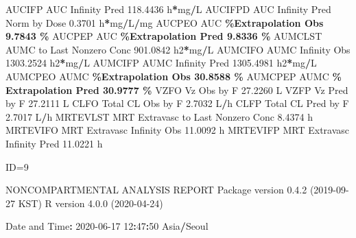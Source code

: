 \documentclass[
  12pt,
]{krantz}
\newenvironment{Shaded}{\begin{snugshade}}{\end{snugshade}}
\newcommand{\DecValTok}[1]{\textcolor[rgb]{0.00,0.00,0.81}{#1}}
\newcommand{\FloatTok}[1]{\textcolor[rgb]{0.00,0.00,0.81}{#1}}
\newcommand{\NormalTok}[1]{#1}
\newcommand{\OperatorTok}[1]{\textcolor[rgb]{0.81,0.36,0.00}{\textbf{#1}}}
\newcommand{\StringTok}[1]{\textcolor[rgb]{0.31,0.60,0.02}{#1}}
\begin{document}
\begin{Shaded}
\begin{Highlighting}[]
\NormalTok{AUCIFP     AUC Infinity Pred                             }\FloatTok{118.4436}\NormalTok{ h}\OperatorTok{*}\NormalTok{mg}\OperatorTok{/}\NormalTok{L}
\NormalTok{AUCIFPD    AUC Infinity Pred Norm by Dose                  }\FloatTok{0.3701}\NormalTok{ h}\OperatorTok{*}\NormalTok{mg}\OperatorTok{/}\NormalTok{L}\OperatorTok{/}\NormalTok{mg}
\NormalTok{AUCPEO     AUC }\OperatorTok{\%Extrapolation Obs                          9.7843 \%}
\NormalTok{AUCPEP     AUC }\OperatorTok{\%Extrapolation Pred                         9.8336 \%}
\NormalTok{AUMCLST    AUMC to Last Nonzero Conc                     }\FloatTok{901.0842}\NormalTok{ h2}\OperatorTok{*}\NormalTok{mg}\OperatorTok{/}\NormalTok{L}
\NormalTok{AUMCIFO    AUMC Infinity Obs                            }\FloatTok{1303.2524}\NormalTok{ h2}\OperatorTok{*}\NormalTok{mg}\OperatorTok{/}\NormalTok{L}
\NormalTok{AUMCIFP    AUMC Infinity Pred                           }\FloatTok{1305.4981}\NormalTok{ h2}\OperatorTok{*}\NormalTok{mg}\OperatorTok{/}\NormalTok{L}
\NormalTok{AUMCPEO    AUMC }\OperatorTok{\%Extrapolation Obs                        30.8588 \%}
\NormalTok{AUMCPEP    AUMC }\OperatorTok{\% Extrapolation Pred                      30.9777 \%}
\NormalTok{VZFO       Vz Obs by F                                    }\FloatTok{27.2260}\NormalTok{ L}
\NormalTok{VZFP       Vz Pred by F                                   }\FloatTok{27.2111}\NormalTok{ L}
\NormalTok{CLFO       Total CL Obs by F                               }\FloatTok{2.7032}\NormalTok{ L}\OperatorTok{/}\NormalTok{h}
\NormalTok{CLFP       Total CL Pred by F                              }\FloatTok{2.7017}\NormalTok{ L}\OperatorTok{/}\NormalTok{h}
\NormalTok{MRTEVLST   MRT Extravasc to Last Nonzero Conc              }\FloatTok{8.4374}\NormalTok{ h}
\NormalTok{MRTEVIFO   MRT Extravasc Infinity Obs                     }\FloatTok{11.0092}\NormalTok{ h}
\NormalTok{MRTEVIFP   MRT Extravasc Infinity Pred                    }\FloatTok{11.0221}\NormalTok{ h}





\NormalTok{ID=}\DecValTok{9}

\NormalTok{                        NONCOMPARTMENTAL ANALYSIS REPORT}
\NormalTok{                       Package version }\DecValTok{0}\NormalTok{.}\FloatTok{4.2}\NormalTok{ (}\DecValTok{2019{-}09{-}27}\NormalTok{ KST)}
\NormalTok{                          R version }\DecValTok{4}\NormalTok{.}\FloatTok{0.0}\NormalTok{ (}\DecValTok{2020{-}04{-}24}\NormalTok{)}

\NormalTok{Date and Time}\OperatorTok{:}\StringTok{ }\DecValTok{2020{-}06{-}17} \DecValTok{12}\OperatorTok{:}\DecValTok{47}\OperatorTok{:}\DecValTok{50}\NormalTok{ Asia}\OperatorTok{/}\NormalTok{Seoul}


\end{Highlighting}
\end{Shaded}
\end{document}
